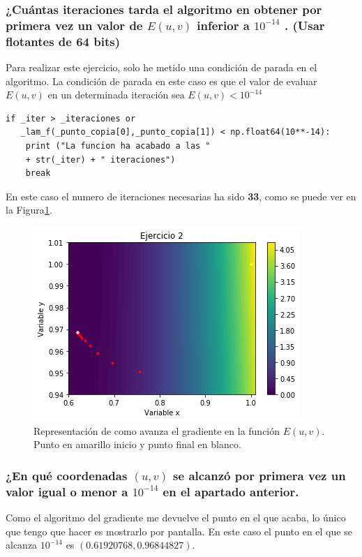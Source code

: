 \documentclass[12pt,a4paper]{article}
\begin{document}
\subsubsection{¿Cuántas iteraciones tarda el algoritmo en obtener por primera vez un valor de \(E(u, v)\) inferior a \(10^{-14}\) . (Usar flotantes de 64 bits)}
Para realizar este ejercicio, solo he metido una condición de parada en el algoritmo. La condición de parada en este caso es que el valor de evaluar \(E(u,v)\) en un determinada iteración sea \(E(u,v)<10^{-14}\)

\begin{verbatim} 
if _iter > _iteraciones or 
   _lam_f(_punto_copia[0],_punto_copia[1]) < np.float64(10**-14):
	print ("La funcion ha acabado a las " 
	+ str(_iter) + " iteraciones")
	break
\end{verbatim}
En este caso el numero de iteraciones necesarias ha sido \textbf{33}, como se puede ver en la Figura\ref{figura1}.

\begin{figure}[H]  %
\centering
\includegraphics{images/primerDescensoGradiente.png}  %
\caption{Representación de como avanza el gradiente en la función \(E(u,v)\). Punto en amarillo inicio y punto final en blanco.}
\label{figura1}
\end{figure}

\subsubsection{¿En qué coordenadas \((u, v)\) se alcanzó por primera vez un valor igual o menor a \(10^{-14}\) en el apartado anterior.}
Como el algoritmo del gradiente me devuelve el punto en el que acaba, lo único que tengo que hacer es mostrarlo por pantalla. En este caso el punto en el que se alcanza \(10^{-14}\) es \textbf{\((0.61920768,0.96844827)\)}.
\end{document}
